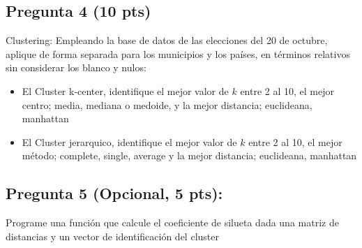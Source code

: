 \documentclass[
]{article}
\providecommand{\tightlist}{%
  \setlength{\itemsep}{0pt}\setlength{\parskip}{0pt}}
\begin{document}
\hypertarget{pregunta-4-10-pts}{%
\subsection{Pregunta 4 (10 pts)}\label{pregunta-4-10-pts}}

Clustering: Empleando la base de datos de las elecciones del 20 de
octubre, aplique de forma separada para los municipios y los países, en
términos relativos sin considerar los blanco y nulos:

\begin{itemize}
\tightlist
\item
  El Cluster k-center, identifique el mejor valor de \(k\) entre 2 al
  10, el mejor centro; media, mediana o medoide, y la mejor distancia;
  euclideana, manhattan
\item
  El Cluster jerarquico, identifique el mejor valor de \(k\) entre 2 al
  10, el mejor método; complete, single, average y la mejor distancia;
  euclideana, manhattan
\end{itemize}

\hypertarget{pregunta-5-opcional-5-pts}{%
\subsection{Pregunta 5 (Opcional, 5
pts):}\label{pregunta-5-opcional-5-pts}}

Programe una función que calcule el coeficiente de silueta dada una
matriz de distancias y un vector de identificación del cluster
\end{document}
